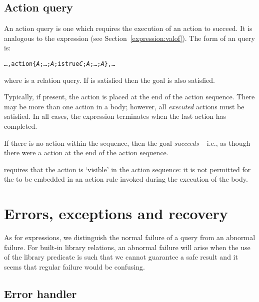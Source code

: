 \subsection{Action query}
\label{goal:special:action}

An action query is one which requires the execution of an action to succeed. It is analogous to the  expression (see Section~\vref{expression:valof}). The form of an  query is:
\begin{alltt}
\ldots,action\{ \emph{A};\ldots;\emph{A};istrue \emph{C};\emph{A};\ldots;\emph{A\subn}\},\ldots
\end{alltt}
where  is a relation query. If  is satisfied then the  goal is also satisfied.

Typically, if present, the  action is placed at the end of the action sequence. There may be more than one  action in a  body; however, all \emph{executed}  actions must be satisfied. In all cases, the  expression terminates when the last action has completed.

If there is no  action within the sequence, then the  goal \emph{succeeds} -- i.e., as though there were a  action at the end of the action sequence.

\go requires that the  action is `visible' in the action sequence: it is not permitted for the  to be embedded in an action rule invoked during the execution of the  body.

\section{Errors, exceptions and recovery}
\label{goal:error}
As for expressions, we distinguish the normal failure of a query from an abnormal failure. For built-in library relations, an abnormal failure will arise when the use of the library predicate is such that we cannot guarantee a safe result and it seems that regular failure would be confusing.

\subsection{Error handler}
\label{goal:errorhandler}

